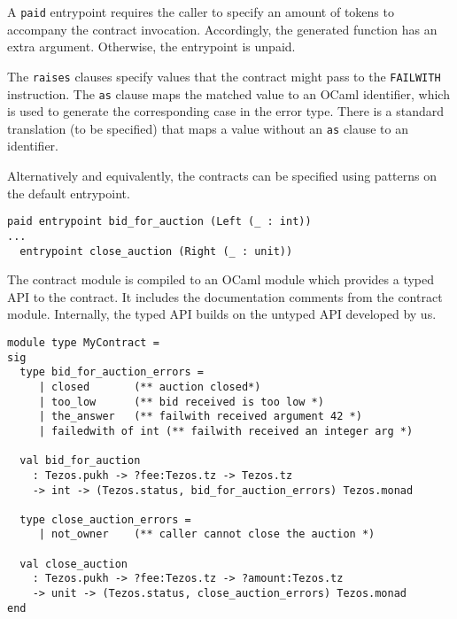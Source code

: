 \documentclass[a4paper]{llncs}
\begin{document}
A \lstinline/paid/ entrypoint requires the caller to specify an amount of tokens to
accompany the contract invocation. Accordingly, the generated function has an extra
argument. Otherwise, the entrypoint is unpaid. 

The \lstinline/raises/ clauses specify values that the contract might
pass to the \texttt{FAILWITH} instruction. The \lstinline/as/ clause
maps the matched value to an OCaml identifier, which is used to
generate the corresponding case in the error type. There is a standard
translation (to be specified) that maps a value without an
\lstinline/as/ clause to an identifier.

Alternatively and equivalently, the contracts can be specified using
patterns on the default entrypoint.

\begin{lstlisting}[caption={Alternative syntax for entrypoints},label={lst:alternative-syntax}]
  paid entrypoint bid_for_auction (Left (_ : int))
...
  entrypoint close_auction (Right (_ : unit))
\end{lstlisting}

The contract module is compiled to an OCaml module which provides a typed API to the
contract. It includes the documentation comments from the contract
module. Internally, the typed API builds on the untyped API developed
by us. 

\begin{lstlisting}[caption={Generated signature},label={lst:generated-signature}]
module type MyContract =
sig
  type bid_for_auction_errors = 
     | closed       (** auction closed*)
     | too_low      (** bid received is too low *)
     | the_answer   (** failwith received argument 42 *)
     | failedwith of int (** failwith received an integer arg *)

  val bid_for_auction
    : Tezos.pukh -> ?fee:Tezos.tz -> Tezos.tz
    -> int -> (Tezos.status, bid_for_auction_errors) Tezos.monad

  type close_auction_errors = 
     | not_owner    (** caller cannot close the auction *)

  val close_auction
    : Tezos.pukh -> ?fee:Tezos.tz -> ?amount:Tezos.tz
    -> unit -> (Tezos.status, close_auction_errors) Tezos.monad
end
\end{lstlisting}
\end{document}
